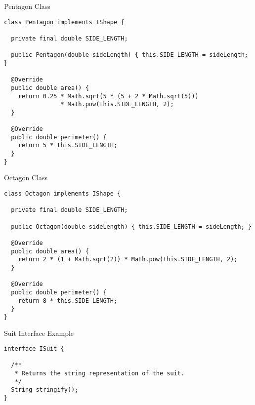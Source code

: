 \begin{cl}[]{Pentagon Class}
\begin{lstlisting}[language=MyJava]
class Pentagon implements IShape {
  
  private final double SIDE_LENGTH;

  public Pentagon(double sideLength) { this.SIDE_LENGTH = sideLength; }

  @Override
  public double area() {
    return 0.25 * Math.sqrt(5 * (5 + 2 * Math.sqrt(5))) 
                * Math.pow(this.SIDE_LENGTH, 2);
  }

  @Override
  public double perimeter() {
    return 5 * this.SIDE_LENGTH;
  }
}
\end{lstlisting}
\end{cl}

\begin{cl}[]{Octagon Class}
\begin{lstlisting}[language=MyJava]
class Octagon implements IShape {

  private final double SIDE_LENGTH;

  public Octagon(double sideLength) { this.SIDE_LENGTH = sideLength; }

  @Override
  public double area() {
    return 2 * (1 + Math.sqrt(2)) * Math.pow(this.SIDE_LENGTH, 2);
  }

  @Override
  public double perimeter() {
    return 8 * this.SIDE_LENGTH;
  }
}
\end{lstlisting}
\end{cl}


\begin{cl}[]{Suit Interface Example}
\begin{lstlisting}[language=MyJava]
interface ISuit {

  /**
   * Returns the string representation of the suit.
   */
  String stringify();
}
\end{lstlisting}
\end{cl}

